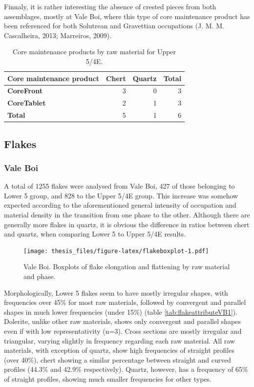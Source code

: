 \documentclass[12pt,twoside]{reedthesis}
\begin{document}
Finnaly, it is rather interesting the absence of crested pieces from both assemblages, mostly at Vale Boi, where this type of core maintenance product has been referenced for both Solutrean and Gravettian occupations (J. M. M. Cascalheira, 2013; Marreiros, 2009).
\begin{table}

\caption{\label{tab:corepreptypeVB}Core maintenance products by raw material for Upper 5/4E.}
\centering
\begin{tabular}[t]{>{\bfseries}lrrr}
\toprule
Core maintenance product & Chert & Quartz & Total\\
\midrule
CoreFront & 3 & 0 & 3\\
CoreTablet & 2 & 1 & 3\\
Total & 5 & 1 & 6\\
\bottomrule
\end{tabular}
\end{table}
\hypertarget{flakes}{%
\subsection{Flakes}\label{flakes}}

\hypertarget{vale-boi-5}{%
\subsubsection{Vale Boi}\label{vale-boi-5}}

A total of 1255 flakes were analysed from Vale Boi, 427 of those belonging to Lower 5 group, and 828 to the Upper 5/4E group. This increase was somehow expected according to the aforementioned general intensity of occupation and material density in the transition from one phase to the other. Although there are generally more flakes in quartz, it is obvious the difference in ratios between chert and quartz, when comparing Lower 5 to Upper 5/4E results.
\begin{figure}
\centering
\texttt{[image: thesis\_files/figure-latex/flakeboxplot-1.pdf]}
\caption{\label{fig:flakeboxplot}Vale Boi. Boxplots of flake elongation and flattening by raw material and phase.}
\end{figure}
Morphologically, Lower 5 flakes seem to have mostly irregular shapes, with frequencies over 45\% for most raw materials, followed by convergent and parallel shapes in much lower frequencies (under 15\%) (table \ref{tab:flakeattributeVB1}). Dolerite, unlike other raw materials, shows only convergent and parallel shapes even if with low representativity (n=3). Cross sections are mostly irregular and triangular, varying slightly in frequency regarding each raw material. All raw materials, with exception of quartz, show high frequencies of straight profiles (over 40\%), chert showing a similar percentage between straight and curved profiles (44.3\% and 42.9\% respectively). Quartz, however, has a frequency of 65\% of straight profiles, showing much smaller frequencies for other types.
\end{document}
